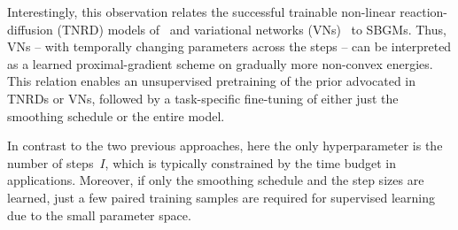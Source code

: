 \documentclass{article}
\theoremstyle{plain}
\theoremstyle{definition}
\theoremstyle{remark}
\begin{document}
Interestingly, this observation relates the successful trainable non-linear reaction-diffusion (TNRD) models of~\citet{ChPo16} and variational networks (VNs)~\citep{KoKl17,HaKl18,EfKo20} to SBGMs.
Thus, VNs -- with temporally changing parameters across the steps -- can be interpreted as a learned proximal-gradient scheme on gradually more non-convex energies.
This relation enables an unsupervised pretraining of the prior advocated in TNRDs or VNs, followed by a task-specific fine-tuning of either just the smoothing schedule or the entire model.

In contrast to the two previous approaches, here the only hyperparameter is the number of steps~$I$, which is typically constrained by the time budget in applications.
Moreover, if only the smoothing schedule and the step sizes are learned, just a few paired training samples are required for supervised learning due to the small parameter space.
\end{document}
